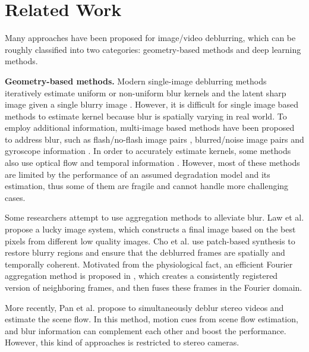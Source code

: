 \documentclass[journal]{IEEEtran}
\begin{document}
\section{Related Work}

Many approaches have been proposed for image/video deblurring, which can be roughly classified into two categories: geometry-based methods and deep learning methods.


\textbf{Geometry-based methods.} Modern single-image deblurring methods iteratively estimate uniform or non-uniform blur kernels and the latent sharp image given a single blurry image \cite{gupta2010single,hirsch2011fast,hu2014joint,Jin_2017_CVPR,Srinivasan_2017_CVPR,Yan_2017_CVPR,Pan_2017_ICCV, Gong_2017_ICCV, Dong_2017_ICCV, Bahat_2017_ICCV, R._2017_ICCV, Park_2017_ICCV}. However, it is difficult for single image based methods to estimate kernel because blur is spatially varying in real world. To employ additional information, multi-image based methods \cite{ito2014blurburst,yuan2007image,petschnigg2004digital,hee2014gyro,tai2008image, Wieschollek_2017_ICCV,Ren_2017_ICCV} have been proposed to address blur, such as flash/no-flash image pairs \cite{petschnigg2004digital}, blurred/noise image pairs \cite{yuan2007image} and gyroscope information \cite{hee2014gyro}. In order to accurately estimate kernels, some methods also use optical flow \cite{hyun2015generalized} and temporal information \cite{li2010generating}.
However, most of these methods are limited by the performance of an assumed degradation model and its estimation, thus some of them are fragile and cannot handle more challenging cases. 

Some researchers attempt to use aggregation methods to alleviate blur. Law et al. \cite{law2006lucky} propose a lucky image system, which constructs a final image based on the best pixels from different low quality images. Cho et al. \cite{cho2012video} use patch-based synthesis to restore blurry regions and ensure that the deblurred frames are spatially and temporally coherent. Motivated from the physiological fact, an efficient Fourier aggregation method is proposed in \cite{delbracio2015burst}, which creates a consistently registered version of neighboring frames, and then fuses these frames in the Fourier domain. 

More recently, Pan et al. \cite{pan2017simultaneous} propose to simultaneously deblur stereo videos and estimate the scene flow. In this method, motion cues from scene flow estimation, and blur information can complement each other and boost the performance. However, this kind of approaches is restricted to stereo cameras.
\end{document}
